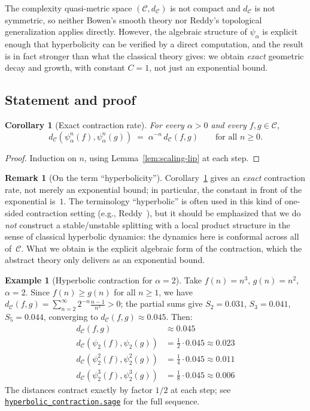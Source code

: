 \documentclass[11pt,a4paper]{article}
\newcommand{\repourl}{https://github.com/gabayae/expansive-homeomorphisms-complexity-qmetric}
\theoremstyle{plain}
\newtheorem{corollaryinner}[theoreminner]{Corollary}
\theoremstyle{definition}
\newtheorem{exampleinner}[theoreminner]{Example}
\newtheorem{remarkinner}[theoreminner]{Remark}
\newenvironment{corollary}[1][]{\begin{corollaryinner}[#1]}{\end{corollaryinner}}
\newenvironment{example}[1][]{\begin{exampleinner}[#1]}{\end{exampleinner}}
\newenvironment{remark}[1][]{\begin{remarkinner}[#1]}{\end{remarkinner}}
\newcommand{\C}{\mathcal{C}}
\begin{document}
The complexity quasi-metric space $(\C,d_\C)$ is not compact and
$d_\C$ is not symmetric, so neither Bowen's smooth theory nor
Reddy's topological generalization applies directly.  However,
the algebraic structure of $\psi_\alpha$ is explicit enough that
hyperbolicity can be verified by a direct computation, and the
result is in fact stronger than what the classical theory gives:
we obtain \emph{exact} geometric decay and growth, with constant
$C=1$, not just an exponential bound.

\subsection{Statement and proof}

\begin{corollary}[Exact contraction rate]\label{cor:exact-contraction}
For every $\alpha>0$ and every $f,g\in\C$,
\[
  d_\C(\psi_\alpha^n(f),\psi_\alpha^n(g))\;=\;\alpha^{-n}\,d_\C(f,g)
  \qquad\text{for all } n\ge 0.
\]
\end{corollary}

\begin{proof}
Induction on $n$, using Lemma~\ref{lem:scaling-lip} at each step.
\end{proof}

\begin{remark}[On the term ``hyperbolicity'']\label{rem:hyperbolicity}
Corollary~\ref{cor:exact-contraction} gives an \emph{exact}
contraction rate, not merely an exponential bound; in particular,
the constant in front of the exponential is~$1$.  The terminology
``hyperbolic'' is often used in this kind of one-sided contraction
setting (e.g., Reddy~\cite{reddy1983}), but it should be emphasized
that we do \emph{not} construct a stable/unstable splitting with a
local product structure in the sense of classical hyperbolic
dynamics: the dynamics here is conformal across all of~$\C$.  What
we obtain is the explicit algebraic form of the contraction, which
the abstract theory only delivers as an exponential bound.
\end{remark}

\begin{example}[Hyperbolic contraction for $\alpha=2$]\label{ex:hyperbolic-alpha2}
Take $f(n)=n^3$, $g(n)=n^2$, $\alpha=2$.  Since $f(n)\ge g(n)$
for all $n\ge 1$, we have $d_\C(f,g)=\sum_{n=2}^\infty
2^{-n}\frac{n-1}{n^3}>0$; the partial sums give $S_2=0.031$,
$S_3=0.041$, $S_5=0.044$, converging to $d_\C(f,g)\approx 0.045$.
Then:
\begin{align*}
d_\C(f,g) &\approx 0.045 \\
d_\C(\psi_2(f),\psi_2(g)) &= \tfrac{1}{2} \cdot 0.045 \approx 0.023 \\
d_\C(\psi_2^2(f),\psi_2^2(g)) &= \tfrac{1}{4} \cdot 0.045 \approx 0.011 \\
d_\C(\psi_2^3(f),\psi_2^3(g)) &= \tfrac{1}{8} \cdot 0.045 \approx 0.006
\end{align*}
The distances contract exactly by factor $1/2$ at each step;
see \href{\repourl/blob/main/code/sagemath/hyperbolic_contraction.sage}{\texttt{hyperbolic\_contraction.sage}}
for the full sequence.
\end{example}
\end{document}
